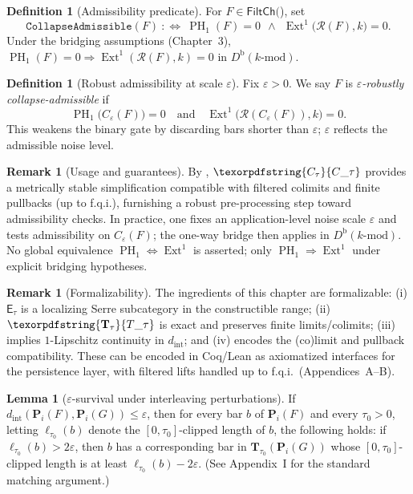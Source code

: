 \documentclass[11pt]{article}
\numberwithin{equation}{section}
\theoremstyle{plain}
\theoremstyle{definition}
\theoremstyle{remark}
\DeclareMathOperator{\Ext}{Ext}
\DeclareMathOperator{\PH}{PH}
\theoremstyle{plain}
\theoremstyle{definition}
\numberwithin{equation}{section}
\newtheorem{lemma}[theorem]{Lemma}
\theoremstyle{definition}
\newtheorem{definition}[theorem]{Definition}
\newtheorem{remark}[theorem]{Remark}
\DeclareRobustCommand{\FiltCh}[1]{\mathsf{FiltCh}(#1)}
\DeclareRobustCommand{\Ttau}{\texorpdfstring{\ensuremath{\mathbf{T}_{\tau}}}{T\_\tau}}
\DeclareRobustCommand{\Ctau}{\texorpdfstring{\ensuremath{C_{\tau}}}{C\_\tau}}
\numberwithin{equation}{section}
\theoremstyle{plain}
\theoremstyle{definition}
\theoremstyle{remark}
\newcommand{\Dbk}{D^{\mathrm{b}}(k\text{-mod})}
\newcommand{\intdist}{d_{\mathrm{int}}}
\newcommand{\Ecat}{\mathsf{E}_\tau}
\providecommand{\Cfun}[1]{\mathsf{C}_{#1}}
\providecommand{\Tfun}[1]{\mathbf{T}_{#1}}
\providecommand{\Ctau}{\Cfun{\tau}}
\providecommand{\Ttau}{\Tfun{\tau}}
\providecommand{\intdist}{d_{\mathrm{int}}}  %
\begin{document}
\begin{definition}[Admissibility predicate]
For \(F\in\FiltCh\), set
\[
\texttt{CollapseAdmissible}(F)\ :\iff\ \PH_1(F)=0\ \ \wedge\ \ \Ext^1\!\big(\mathcal{R}(F),k\big)=0.
\]
Under the bridging assumptions (Chapter~3), \(\PH_1(F)=0\Rightarrow \Ext^1(\mathcal{R}(F),k)=0\) in \(\Dbk\).
\end{definition}

\begin{definition}[Robust admissibility at scale \(\varepsilon\)]
Fix \(\varepsilon>0\). We say \(F\) is \emph{\(\varepsilon\)-robustly collapse-admissible} if
\[
\PH_1\!\big(C_\varepsilon(F)\big)=0\quad\text{and}\quad \Ext^1\!\big(\mathcal{R}(C_\varepsilon(F)),k\big)=0.
\]
This weakens the binary gate by discarding bars shorter than \(\varepsilon\); \(\varepsilon\) reflects the admissible noise level.
\end{definition}

\begin{remark}[Usage and guarantees]
By , \(\Ctau\) provides a metrically stable simplification compatible with filtered colimits and finite pullbacks (up to f.q.i.), furnishing a robust pre-processing step toward admissibility checks. In practice, one fixes an application-level noise scale \(\varepsilon\) and tests admissibility on \(C_\varepsilon(F)\); the one-way bridge then applies in \(\Dbk\). No global equivalence \(\PH_1\Leftrightarrow \Ext^1\) is asserted; only \(\PH_1\Rightarrow \Ext^1\) under explicit bridging hypotheses.
\end{remark}

\begin{remark}[Formalizability]
The ingredients of this chapter are formalizable: (i) \(\Ecat\) is a localizing Serre subcategory in the constructible range; (ii) \(\Ttau\) is exact and preserves finite limits/colimits; (iii)  implies \(1\)-Lipschitz continuity in \(\intdist\); and (iv)  encodes the (co)limit and pullback compatibility. These can be encoded in Coq/Lean as axiomatized interfaces for the persistence layer, with filtered lifts handled up to f.q.i.\ (Appendices~A–B).
\end{remark}

\begin{lemma}[\(\varepsilon\)-survival under interleaving perturbations]\label{lem:epsilon-survival}
If \(\intdist(\mathbf{P}_i(F),\mathbf{P}_i(G))\le \varepsilon\), then for every bar \(b\) of \(\mathbf{P}_i(F)\) and every \(\tau_0>0\), letting \(\ell_{\tau_0}(b)\) denote the \([0,\tau_0]\)-clipped length of \(b\), the following holds:
if \(\ell_{\tau_0}(b)>2\varepsilon\), then \(b\) has a corresponding bar in \(\mathbf{T}_{\tau_0}(\mathbf{P}_i(G))\) whose \([0,\tau_0]\)-clipped length is at least \(\ell_{\tau_0}(b)-2\varepsilon\). (See Appendix~I for the standard matching argument.)
\end{lemma}
\end{document}
